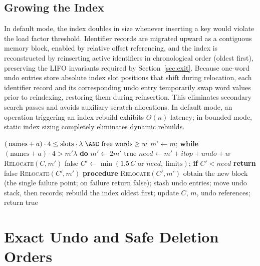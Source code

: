 \subsection{Growing the Index}
\label{sec:rebuild}
In default mode, the index doubles in size whenever inserting a key would violate the load factor threshold. Identifier records are migrated upward as a contiguous memory block, enabled by relative offset referencing, and the index is reconstructed by reinserting active identifiers in chronological order (oldest first), preserving the LIFO invariants required by Section~\ref{sec:exit}. Because one-word undo entries store absolute index slot positions that shift during relocation, each identifier record and its corresponding undo entry temporarily swap word values prior to reindexing, restoring them during reinsertion. This eliminates secondary search passes and avoids auxiliary scratch allocations. In default mode, an operation triggering an index rebuild exhibits $O(n)$ latency; in bounded mode, static index sizing completely eliminates dynamic rebuilds.

\begin{algorithm}[t!]
\caption{\textsc{Ensure}$(w, a)$: room for $w$ stack words and $a$ new index entries}
\label{alg:ensure}
\begin{algorithmic}[1]
 \RETURN $(\,\text{names}+a)\cdot 4 \le \text{slots}\cdot\lambda \;\AND\; \text{free words} \ge w$ \ENDIF \hfill{}
\STATE $m' \leftarrow m$; \textbf{while} $(\text{names}+a)\cdot4 > m'\lambda$ \textbf{do} $m' \leftarrow 2m'$ \hfill{}
 \RETURN true \ENDIF
\STATE $\mathit{need} \leftarrow m' + \mathit{itop} + \mathit{undo} + w$
 \RETURN \textsc{Relocate}$(C, m')$ \ENDIF \hfill{}
 \RETURN false \ENDIF
\STATE $C' \leftarrow \min(1.5\,C \text{ or } \mathit{need},\ \text{limits})$; \textbf{if} $C' < \mathit{need}$ \textbf{return} false
\RETURN \textsc{Relocate}$(C', m')$
\STATE \textbf{procedure} \textsc{Relocate}$(C', m')$ \hfill{}
\STATE obtain the new block (the single failure point; on failure return false); stash undo entries; move undo stack, then records; rebuild the index oldest first; update $C$, $m$, undo references; return true
\end{algorithmic}
\end{algorithm}

\section{Exact Undo and Safe Deletion Orders}
\label{sec:undo}


